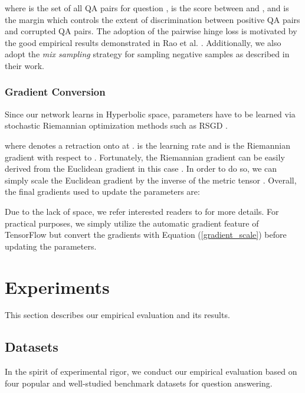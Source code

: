 \documentclass[sigconf]{acmart}
\begin{document}
where  is the set of all QA pairs for question ,  is the score between  and , and  is the margin which controls the extent of discrimination between positive QA pairs and corrupted QA pairs. The adoption of the pairwise hinge loss is motivated by the good empirical results demonstrated in Rao et al. \cite{DBLP:conf/cikm/RaoHL16}. Additionally, we also adopt the \textit{mix sampling} strategy for sampling negative samples as described in their work. 

\subsubsection{Gradient Conversion}
Since our network learns in Hyperbolic space, parameters have to be learned via stochastic Riemannian optimization methods such as RSGD \cite{DBLP:journals/tac/Bonnabel13}. 

where  denotes a retraction onto  at .  is the learning rate and  is the Riemannian gradient with respect to . Fortunately, the Riemannian gradient can be easily derived from the Euclidean gradient in this case \cite{DBLP:journals/tac/Bonnabel13}. In order to do so, we can simply scale the Euclidean gradient by the inverse of the metric tensor . Overall, the final gradients used to update the parameters are:
 
Due to the lack of space, we refer interested readers to \cite{DBLP:journals/corr/NickelK17,DBLP:journals/tac/Bonnabel13} for more details. For practical purposes, we simply utilize the automatic gradient feature of TensorFlow but convert the gradients with Equation (\ref{gradient_scale}) before updating the parameters. 



\section{Experiments}
This section describes our empirical evaluation and its results. 
\subsection{Datasets}
In the spirit of experimental rigor, we conduct our empirical evaluation based on four popular and well-studied benchmark datasets for question answering. 
\end{document}
